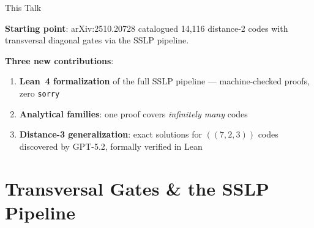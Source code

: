 \documentclass[aspectratio=169,t]{beamer}
\newcommand{\code}[1]{\texttt{\small #1}}
\begin{document}
\begin{frame}{This Talk}

\textbf{Starting point}: arXiv:2510.20728 catalogued \alert{14,116} distance-2 codes
with transversal diagonal gates via the SSLP pipeline.

\vspace{0.2em}
\textbf{Three new contributions}:
\begin{enumerate}\setlength\itemsep{1pt}
\item \textbf{Lean~4 formalization} of the full SSLP pipeline ---
  machine-checked proofs, zero \code{sorry}
\item \textbf{Analytical families}: one proof covers \emph{infinitely many} codes
\item \textbf{Distance-3 generalization}: exact solutions for $((7,2,3))$ codes
  discovered by \alert{GPT-5.2}, formally verified in Lean
\end{enumerate}

\vspace{0.3em}
\begin{center}
\end{center}
\end{frame}

\section{Transversal Gates \& the SSLP Pipeline}
\end{document}
